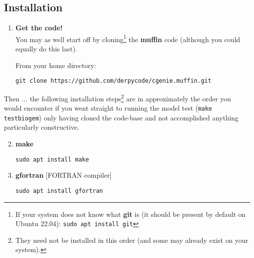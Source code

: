 \documentclass[10pt,twoside]{article}
\begin{document}
\subsection{Installation}
\vspace{1mm}

\begin{enumerate}[noitemsep]

\vspace{4pt}
\item \textbf{Get the code!}
\vspace{2pt}
\\You may as well start off by cloning\footnote{If your system does not know what \textbf{git} is (it should be present by default on Ubuntu 22.04): \texttt{sudo apt install git}} the \textbf{muffin} code (although you could equally do this last).

From your home directory:
\vspace{-2pt}
\begin{verbatim}
git clone https://github.com/derpycode/cgenie.muffin.git
\end{verbatim}

\end{enumerate}

\vspace{4pt}

\noindent Then ... the following installation steps\footnote{They need not be installed in this order (and some may already exist on your system).}  are in approximately the order you would encounter if you went straight to running the model test (\texttt{make testbiogem}) only having cloned the code-base and not accomplished anything particularly constructive.

\begin{enumerate}[noitemsep]
\setcounter{enumi}{1}

\item \textbf{make}
\vspace{-2pt}
\begin{verbatim}
sudo apt install make
\end{verbatim}

\vspace{4pt}
\item \textbf{gfortran} [FORTRAN compiler]
\vspace{-2pt}
\begin{verbatim}
sudo apt install gfortran
\end{verbatim}

\end{enumerate}
\end{document}
